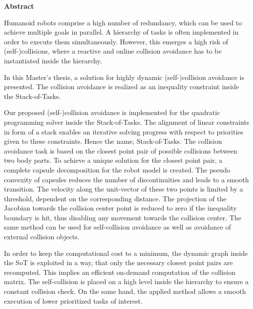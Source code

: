 

\clearemptydoublepage
{}
{}	

\vspace*{1cm}
\begin{center}
{\Large \bf Abstract}
\end{center}
\vspace{1cm}

Humanoid robots comprise a high number of redundancy, which can be used to achieve multiple goals in parallel. A hierarchy of tasks is often implemented in order to execute them simultaneously. However, this emerges a high risk of (self-)collisions, where a reactive and online collision avoidance has to be instantiated inside the hierarchy.  	

In this Master's thesis, a solution for highly dynamic (self-)collision avoidance is presented. The collision avoidance is realized as an inequality constraint inside the Stack-of-Tasks. 

Our proposed (self-)collision avoidance is implemented for the quadratic programming solver inside the Stack-of-Tasks. The alignment of linear constraints in form of a stack enables an iterative solving progress with respect to priorities given to these constraints. Hence the name, Stack-of-Tasks. The collision avoidance task is based on the closest point pair of possible collisions between two body parts. To achieve a unique solution for the closest point pair, a complete capsule decomposition for the robot model is created. The pseudo convexity of capsules reduces the number of discontinuities and leads to a smooth transition. The velocity along the unit-vector of these two points is limited by a threshold, dependent on the corresponding distance. The projection of the Jacobian towards the collision center point is reduced to zero if the inequality boundary is hit, thus disabling any movement towards the collision center. The same method can be used for self-collision avoidance as well as avoidance of external collision objects.

In order to keep the computational cost to a minimum, the dynamic graph inside the SoT is exploited in a way, that only the necessary closest point pairs are recomputed. This implies an efficient on-demand computation of the collision matrix. The self-collision is placed on a high level inside the hierarchy to ensure a constant collision check. On the same hand, the applied method allows a smooth execution of lower prioritized tasks of interest.
%
